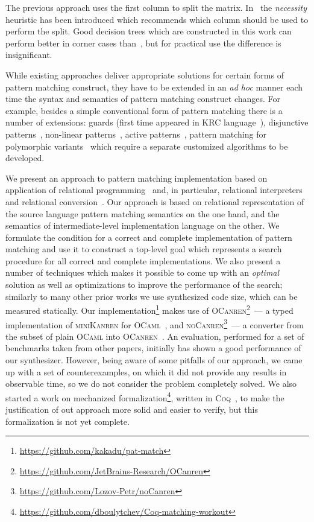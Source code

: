 The previous approach uses the first column to split the matrix. In~\cite{maranget2008} the \emph{necessity} heuristic has been introduced which recommends which column should be
used to perform the split. Good decision trees which are constructed in this work can perform better in corner cases than~\cite{maranget2001}, but for practical use the
difference is insignificant.

While existing approaches deliver appropriate solutions for certain forms of pattern matching construct, they have to be extended in an \emph{ad hoc} manner each time
the syntax and semantics of pattern matching construct changes. For example, besides a simple conventional form of pattern matching there is a number of extensions:
guards (first time appeared in KRC language~\cite{turner2013}), disjunctive patterns~\cite{ocaml}, non-linear patterns~\cite{mcbride1969symbol}, active patterns~\cite{activepatterns}, pattern matching for polymorphic variants~\cite{Garrigue98} 
which require a separate customized algorithms to be developed.

We present an approach to pattern matching implementation based on application of relational programming~\cite{TRS,WillThesis} and, in particular, relational interpreters~\cite{unified}
and relational conversion~\cite{conversion}. Our approach is based on relational representation of the source language pattern matching semantics on the one hand, and
the semantics of intermediate-level implementation language on the other. We formulate the condition for a correct and complete implementation of pattern matching and use it to
construct a top-level goal which represents a search procedure for all correct and complete implementations. We also present a number of techniques which makes it possible to come up with an
\emph{optimal} solution as well as optimizations to improve the performance of the search; similarly to many other prior works we use synthesized code size, which can be measured statically.
Our implementation\footnote{\url{https://github.com/kakadu/pat-match}} makes use of \textsc{OCanren}\footnote{\url{https://github.com/JetBrains-Research/OCanren}}~--- a typed
implementation of \textsc{miniKanren} for \textsc{OCaml}~\cite{OCanren}, and \textsc{noCanren}\footnote{\url{https://github.com/Lozov-Petr/noCanren}}~--- a converter from the subset
of plain \textsc{OCaml} into \textsc{OCanren}~\cite{conversion}. An evaluation, performed for a set of benchmarks taken from other papers, initially has shown a good performance of our synthesizer.
However, being aware of some pitfalls of our approach, we came up with a set of counterexamples, on which it did not provide any results in observable time, so we do not consider the problem
completely solved. We also started a work on mechanized formalization\footnote{\url{https://github.com/dboulytchev/Coq-matching-workout}}, written in \textsc{Coq}~\cite{Coq}, to
make the justification of out approach more solid and easier to verify, but this formalization is not yet complete. 

 
